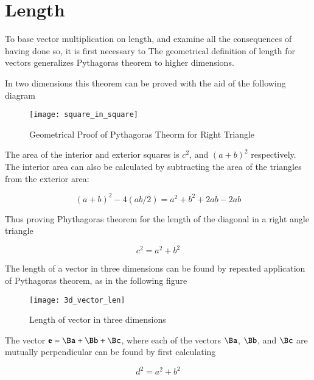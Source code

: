 \documentclass{article}      %
\title{} %
\author{Peeter Joot}         %
\date{ March 17, 2008.  Last Revision: $Date: 2009/02/22 15:35:07 $ }
\begin{document}

\maketitle{}

\section{Length}

To base vector multiplication on length, and examine all the consequences of having done so, it is first necessary to 
The geometrical definition of length for vectors generalizes Pythagoras theorem to higher dimensions.

In two dimensions this theorem can be proved with the aid of the following diagram

\begin{figure}[htp]
\centering
\texttt{[image: square\_in\_square]}
\caption{Geometrical Proof of Pythagoras Theorm for Right Triangle}\label{fig:phthagoras}
\end{figure}

The area of the interior and exterior squares is $c^2$, and $(a+b)^2$ respectively.  The interior area can also be calculated by subtracting the area of the triangles from the exterior area:

\[
(a+b)^2 - 4(ab/2) = a^2 + b^2 + 2ab - 2ab
\]

Thus proving Phythagoras theorem for the length of the diagonal in a right angle triangle

\[
c^2 = a^2 + b^2
\]


The length of a vector in three dimensions can be found by repeated application of Pythagoras theorem, as in the following figure 

\begin{figure}[htp]
\centering
\texttt{[image: 3d\_vector\_len]}
\caption{Length of vector in three dimensions}\label{fig:3dveclen}
\end{figure}

The vector $\Be = \Ba + \Bb + \Bc$, where each of the vectors $\Ba$, $\Bb$, and $\Bc$ are mutually perpendicular can be found by first calculating

\[
d^2 = a^2 + b^2
\]
\end{document}
